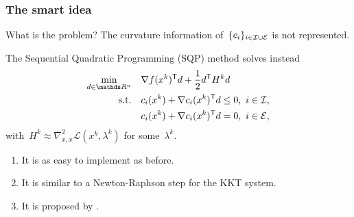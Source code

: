 \documentclass{polyu-presentation}
\newcommand{\con}[1]{c_{#1}}
\newcommand{\ieq}{\mathcal{E}}
\newcommand{\iub}{\mathcal{I}}
\newcommand{\lag}{\mathcal{L}}
\newcommand{\obj}{f}
\begin{document}
\begin{frame}
    \frametitle{The smart idea}

    \begin{block}{What is the problem?}
        The \alert{curvature information} of~$\set{\con{i}}_{i \in \iub \cup \ieq}$ is not represented.
    \end{block}

    \smallskip

    The \alert{Sequential Quadratic Programming} (SQP) method solves instead
    \begin{align*}
        \min_{d \in \R^n}   & \quad \nabla \obj(x^k)^{\T} d + \frac{1}{2} d^{\T} H^k d\\
        \text{s.t.}         & \quad \con{i}(x^k) + \nabla \con{i}(x^k)^{\T} d \le 0, ~ i \in \iub,\\
                            & \quad \con{i}(x^k) + \nabla \con{i}(x^k)^{\T} d = 0, ~ i \in \ieq,
    \end{align*}
    with~$H^k \approx \nabla_{x, x}^2 \lag(x^k, \lambda^k)$ for some~$\lambda^k$.

    \smallskip

    \begin{block}{}
        \begin{enumerate}[<+(1)->]
            \item It is as easy to \alert{implement} as before.
            \item It is similar to a \alert{Newton-Raphson} step for the \alert{KKT system}.
            \item It is \alert{proposed} by \cite{Wilson_1963,Han_1976,Han_1977,Powell_1978a,Powell_1978b,Powell_1987}.
        \end{enumerate}
    \end{block}
\end{frame}
\end{document}
